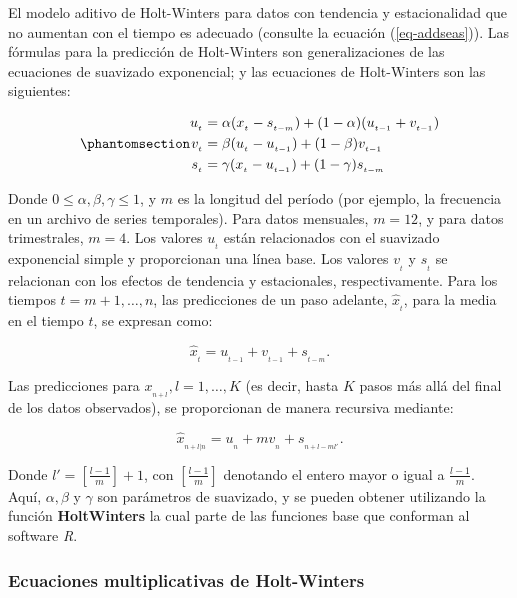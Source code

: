 \documentclass[
  us-letterpaper,
]{scrreprt}
\theoremstyle{plain}
\theoremstyle{definition}
\theoremstyle{definition}
\theoremstyle{plain}
\theoremstyle{remark}
\begin{document}
El modelo aditivo de Holt-Winters para datos con tendencia y
estacionalidad que no aumentan con el tiempo es adecuado (consulte la
ecuación (\ref{eq-addseas})). Las fórmulas para la predicción de
Holt-Winters son generalizaciones de las ecuaciones de suavizado
exponencial; y las ecuaciones de Holt-Winters son las siguientes:

\begin{equation}\phantomsection\label{eq-extexp}{
\begin{split}
u_{_t}&= \alpha(x_{_t}-s_{_{t-m}})+(1-\alpha)(u_{_{t-1}}+v_{_{t-1}})\\
v_{_t}&= \beta(u_{_t}-u_{_{t-1}})+(1-\beta)v_{_{t-1}}\\
s_{_t}&= \gamma(x_{_t}-u_{_{t-1}})+(1-\gamma)s_{_{t-m}}
\end{split}
}\end{equation}

Donde \(0 \le \alpha, \beta, \gamma \le 1\), y \(m\) es la longitud del
período (por ejemplo, la frecuencia en un archivo de series temporales).
Para datos mensuales, \(m = 12\), y para datos trimestrales, \(m = 4\).
Los valores \(u_{_t}\) están relacionados con el suavizado exponencial
simple y proporcionan una línea base. Los valores \(v_{_t}\) y
\(s_{_t}\) se relacionan con los efectos de tendencia y estacionales,
respectivamente. Para los tiempos \(t= m+1,\ldots, n\), las predicciones
de un paso adelante, \(\hat{x}_{_t}\), para la media en el tiempo \(t\),
se expresan como:

\[ \hat{x}_{_t}= u_{_{t-1}}+v_{_{t-1}}+s_{_{t-m}}.\]

Las predicciones para \(x_{_{n+l}}, l=1,\ldots,K\) (es decir, hasta
\(K\) pasos más allá del final de los datos observados), se proporcionan
de manera recursiva mediante:

\[
\hat{x}_{_{n+l|n}}=u_{_n}+mv_{_n}+s_{_{n+l-ml'}}.
\]

Donde \(l' =\left[ \frac{l-1}{m} \right] + 1\), con
\(\left[ \frac{l-1}{m} \right]\) denotando el entero mayor o igual a
\(\frac{l-1}{m}\). Aquí, \(\alpha, \beta\) y \(\gamma\) son parámetros
de suavizado, y se pueden obtener utilizando la función
\textbf{HoltWinters} la cual parte de las funciones base que conforman
al software \emph{R}.

\subsubsection{Ecuaciones multiplicativas de
Holt-Winters}\label{ecuaciones-multiplicativas-de-holt-winters}
\end{document}
